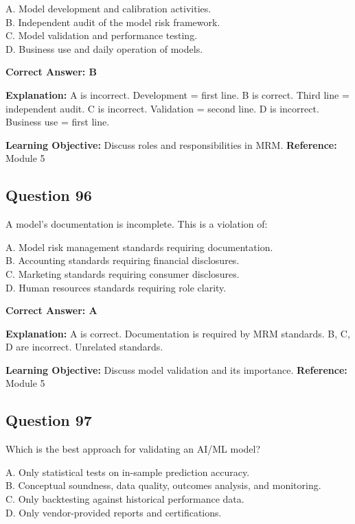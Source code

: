 \documentclass[11pt]{article}
\begin{document}
	A. Model development and calibration activities.\\
	B. Independent audit of the model risk framework.\\
	C. Model validation and performance testing.\\
	D. Business use and daily operation of models.
	
	\vspace{0.4em}
	\textbf{Correct Answer: B}
	
	\textbf{Explanation:}
	A is incorrect. Development = first line.
	B is correct. Third line = independent audit.
	C is incorrect. Validation = second line.
	D is incorrect. Business use = first line.
	
	\textbf{Learning Objective:} Discuss roles and responsibilities in MRM.
	\textbf{Reference:} Module 5
	
	\subsection*{Question 96}
	A model's documentation is incomplete. This is a violation of:
	
	A. Model risk management standards requiring documentation.\\
	B. Accounting standards requiring financial disclosures.\\
	C. Marketing standards requiring consumer disclosures.\\
	D. Human resources standards requiring role clarity.
	
	\vspace{0.4em}
	\textbf{Correct Answer: A}
	
	\textbf{Explanation:}
	A is correct. Documentation is required by MRM standards.
	B, C, D are incorrect. Unrelated standards.
	
	\textbf{Learning Objective:} Discuss model validation and its importance.
	\textbf{Reference:} Module 5
	
	\subsection*{Question 97}
	Which is the best approach for validating an AI/ML model?
	
	A. Only statistical tests on in-sample prediction accuracy.\\
	B. Conceptual soundness, data quality, outcomes analysis, and monitoring.\\
	C. Only backtesting against historical performance data.\\
	D. Only vendor-provided reports and certifications.
	
\end{document}
